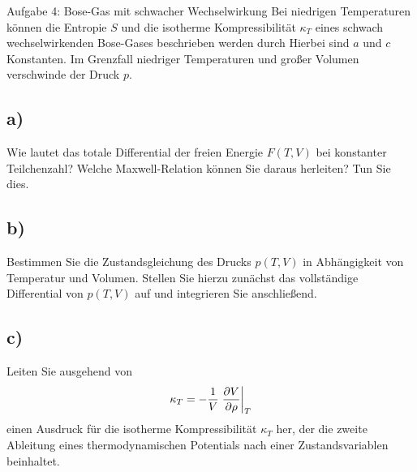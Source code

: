 \begin{aufgabe}{Aufgabe 4: Bose-Gas mit schwacher Wechselwirkung}
    Bei niedrigen Temperaturen können die Entropie $S$ und die isotherme Kompressibilität $\kappa_T$ eines schwach wechselwirkenden Bose-Gases beschrieben werden durch
    Hierbei sind $a$ und $c$ Konstanten. Im Grenzfall niedriger Temperaturen und großer Volumen verschwinde der Druck $p$.

    \subsection{a)}
    Wie lautet das totale Differential der freien Energie $F(T,V)$ bei konstanter Teilchenzahl?
    Welche Maxwell-Relation können Sie daraus herleiten?
    Tun Sie dies.

    \subsection{b)}
    Bestimmen Sie die Zustandsgleichung des Drucks $p(T,V)$ in Abhängigkeit von Temperatur und Volumen.
    Stellen Sie hierzu zunächst das vollständige Differential von $p(T,V)$ auf und integrieren Sie anschließend.

    \subsection{c)}
    Leiten Sie ausgehend von
    \[
        \kappa_T = -\frac{1}{V}\left.\frac{\partial V}{\partial \rho}\right\rvert_{T}
    \]
    einen Ausdruck für die isotherme Kompressibilität $\kappa_T$ her, der die zweite Ableitung eines thermodynamischen Potentials nach einer Zustandsvariablen beinhaltet.
    \end{aufgabe}

